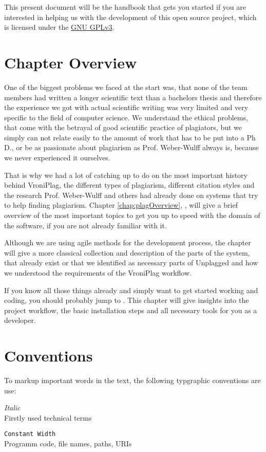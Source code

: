 This present document will be the handbook that gets you started if you are interested in helping us with the development of this 
open source project, which is licensed under the \href{http://www.gnu.org/licenses/quick-guide-gplv3}{GNU GPLv3}.

\section{Chapter Overview}

One of the biggest problems we faced at the start was, that none of the team members had written a longer scientific
text than a bachelors
thesis and therefore the experience we got with actual scientific writing was very limited and very specific to the 
field of computer science. We understand the ethical problems, that come with the betrayal of 
good scientific practice of plagiators, but we simply can not relate easily to the amount of work that has to be put into 
a Ph D., or be as 
passionate about plagiarism as Prof. Weber-Wulff always is, because we never experienced it ourselves.

That is why we had a lot of catching up to do on the most important history behind VroniPlag, the different types
of plagiarism, different citation styles and the research Prof. Weber-Wulff and others had already done on systems that try to 
help finding plagiarism. Chapter \ref{chap:plagOverview}, , will
give a brief overview of the most important topics to get you up to speed with the domain of the software, if you are
not already familiar with it.

Although we are using agile methods for the development process, the chapter  will give
a more classical collection and description of the parts of the system, that already exist or that we identified as 
necessary parts of Unplagged and how we understood the requirements of the 
VroniPlag workflow.

If you know all those things already and simply want to get started working and coding, you should probably jump
to . This chapter will give insights into the project workflow, the basic installation
steps and all necessary tools for you as a developer.

\section{Conventions}

To markup important words in the text, the following typgraphic conventions are use:

\begin{description}
\item \textit{Italic} \hfill \\
  Firstly used technical terms
\item \texttt{Constant Width} \hfill \\
  Programm code, file names, paths, URIs
\end{description}